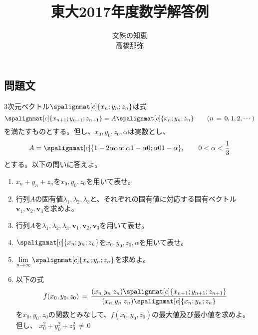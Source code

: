 \documentclass[dvipdfmx,titlepage, 11pt, a4paper]{jsarticle}%
\title{\Huge 東大2017年度数学解答例\\[10mm]}
\author{{\LARGE 文殊の知恵}\\[1mm]\LARGE 高橋那弥}
\date{}
\begin{document}
\maketitle
\tableofcontents %
\newpage
\setcounter{tocdepth}{3}%
\section{}%
\subsection{問題文}
3次元ベクトル$\spalignmat[c]{
    {x_n};
    {y_n};
    {z_n}
}$は式
\begin{equation*}
    \spalignmat[c]{
        {x_{n + 1}};
        {y_{n + 1}};
        {z_{n + 1}}
    }
    = 
    A \spalignmat[c]{
        {x_n};
        {y_n};
        {z_n}
    }\qquad (n \, = \, 0, 1, 2, \cdots)
\end{equation*}
を満たすものとする。但し、$x_0, y_0, z_0, \alpha$は実数とし、
\begin{equation*}
    A = \spalignmat[c]{
        {1 - 2\alpha} {\alpha} {\alpha};
        {\alpha} {1 - \alpha} {0};
        {\alpha} {0} {1 - \alpha}
    }, \qquad 0 < \alpha < \frac{1}{3}
\end{equation*}
とする。以下の問いに答えよ。
\begin{enumerate}[(1)]
  \item $x_n + y_n + z_n$を$x_0, y_0, z_0$を用いて表せ。
  \item 行列$A$の固有値$\lambda_1, \lambda_2, \lambda_3$と、それぞれの固有値に対応する固有ベクトル
        $\mathbold{v}_1, \mathbold{v}_2, \mathbold{v}_3$を求めよ。
  \item 行列$A$を$\lambda_1, \lambda_2, \lambda_3, \mathbold{v}_1, \mathbold{v}_2, \mathbold{v}_3$を用いて表せ。
  \item $\spalignmat[c]{
    {x_n};
    {y_n};
    {z_n}
  }$を$x_0, y_0, z_0, \alpha$を用いて表せ。
  \item $\lim\limits_{n \to \infty} \spalignmat[c]{
      {x_n};
      {y_n};
      {z_n}
  }$を求めよ。
  \item 以下の式
  \begin{equation*}
	  f(x_0, y_0, z_0)\, = \, \frac{
		  (x_n\;y_n\; z_n)
	  \spalignmat[c]{
		  {x_{n + 1}};
		  {y_{n + 1}};
		  {z_{n + 1}}
	  }}{(x_n\;y_n\; z_n)\spalignmat[c]{
		  {x_n};
		  {y_n};
		  {z_n}
	  }}
  \end{equation*}
  を$x_0, y_0, z_0$の関数とみなして、$f(x_0, y_0, z_0)$の最大値及び最小値を求めよ。但し、
  $x_0^{2} + y_0^{2} + z_0^{2}\, \neq \, 0$
\end{enumerate}
\newpage
\end{document}
